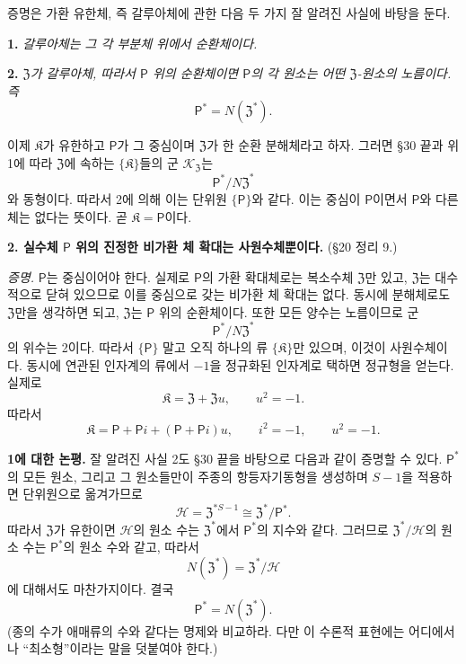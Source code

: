 증명은 가환 유한체, 즉 갈루아체에 관한 다음 두 가지 잘 알려진 사실에 바탕을 둔다.

\noindent\textbf{1.} \emph{갈루아체는 그 각 부분체 위에서 순환체이다.}

\noindent\textbf{2.} \emph{\(\mathfrak Z\)가 갈루아체, 따라서 \(\mathsf P\) 위의 순환체이면 \(\mathsf P\)의 각 원소는 어떤 \(\mathfrak Z\)-원소의 노름이다. 즉}
\[
        \mathsf P^*=N(\mathfrak Z^*).
\]

이제 \(\mathfrak K\)가 유한하고 \(\mathsf P\)가 그 중심이며 \(\mathfrak Z\)가 한 순환 분해체라고 하자. 그러면 §30 끝과 위 1에 따라 \(\mathfrak Z\)에 속하는 \(\{\mathfrak K\}\)들의 군 \(\mathscr K_{\mathfrak Z}\)는
\[
        \mathsf P^*/N\mathfrak Z^*
\]
와 동형이다. 따라서 2에 의해 이는 단위원 \(\{\mathsf P\}\)와 같다. 이는 중심이 \(\mathsf P\)이면서 \(\mathsf P\)와 다른 체는 없다는 뜻이다. 곧 \(\mathfrak K=\mathsf P\)이다.

\noindent\textbf{2. 실수체 \(\mathsf P\) 위의 진정한 비가환 체 확대는 사원수체뿐이다.} (§20 정리 9.)

\noindent\emph{증명.} \(\mathsf P\)는 중심이어야 한다. 실제로 \(\mathsf P\)의 가환 확대체로는 복소수체 \(\mathfrak Z\)만 있고, \(\mathfrak Z\)는 대수적으로 닫혀 있으므로 이를 중심으로 갖는 비가환 체 확대는 없다. 동시에 분해체로도 \(\mathfrak Z\)만을 생각하면 되고, \(\mathfrak Z\)는 \(\mathsf P\) 위의 순환체이다. 또한 모든 양수는 노름이므로 군
\[
        \mathsf P^*/N\mathfrak Z^*
\]
의 위수는 2이다. 따라서 \(\{\mathsf P\}\) 말고 오직 하나의 류 \(\{\mathfrak K\}\)만 있으며, 이것이 사원수체이다. 동시에 연관된 인자계의 류에서 \(-1\)을 정규화된 인자계로 택하면 정규형을 얻는다. 실제로
\[
        \mathfrak K=\mathfrak Z+\mathfrak Zu,
        \qquad
        u^2=-1.
\]
따라서
\[
        \mathfrak K
        =\mathsf P+\mathsf Pi+(\mathsf P+\mathsf Pi)u,
        \qquad
        i^2=-1,
        \qquad
        u^2=-1.
\]

\noindent\textbf{1에 대한 논평.} 잘 알려진 사실 2도 §30 끝을 바탕으로 다음과 같이 증명할 수 있다. \(\mathsf P^*\)의 모든 원소, 그리고 그 원소들만이 주종의 항등자기동형을 생성하며 \(S-1\)을 적용하면 단위원으로 옮겨가므로
\[
        \mathscr H=\mathfrak Z^{*S-1}
        \cong\mathfrak Z^*/\mathsf P^*.
\]
따라서 \(\mathfrak Z\)가 유한이면 \(\mathscr H\)의 원소 수는 \(\mathfrak Z^*\)에서 \(\mathsf P^*\)의 지수와 같다. 그러므로 \(\mathfrak Z^*/\mathscr H\)의 원소 수는 \(\mathsf P^*\)의 원소 수와 같고, 따라서
\[
        N(\mathfrak Z^*)
        =\mathfrak Z^*/\mathscr H
\]
에 대해서도 마찬가지이다. 결국
\[
        \mathsf P^*=N(\mathfrak Z^*).
\]
(종의 수가 애매류의 수와 같다는 명제와 비교하라. 다만 이 수론적 표현에는 어디에서나 ``최소형''이라는 말을 덧붙여야 한다.)

